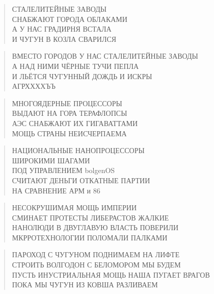 \poemtitle{***}
\begin{verse}
СТАЛЕЛИТЕЙНЫЕ ЗАВОДЫ\\
СНАБЖАЮТ ГОРОДА ОБЛАКАМИ\\
А У НАС ГРАДИРНЯ ВСТАЛА\\
И ЧУГУН В КОЗЛА СВАРИЛСЯ
\end{verse}

\poemtitle{***}
\begin{verse}
ВМЕСТО ГОРОДОВ У НАС СТАЛЕЛИТЕЙНЫЕ ЗАВОДЫ\\
А НАД НИМИ ЧЁРНЫЕ ТУЧИ ПЕПЛА\\
И ЛЬЁТСЯ ЧУГУННЫЙ ДОЖДЬ И ИСКРЫ\\
АГРХХХХЪЪ
\end{verse}

\poemtitle{***}
\begin{verse}
МНОГОЯДЕРНЫЕ ПРОЦЕССОРЫ\\
ВЫДАЮТ НА ГОРА ТЕРАФЛОПСЫ\\
АЭС СНАБЖАЮТ ИХ ГИГАВАТТАМИ\\
МОЩЬ СТРАНЫ НЕИСЧЕРПАЕМА
\end{verse}

\poemtitle{***}
\begin{verse}
НАЦИОНАЛЬНЫЕ НАНОПРОЦЕССОРЫ\\
ШИРОКИМИ ШАГАМИ \\
ПОД УПРАВЛЕНИЕМ bolgenOS\\
СЧИТАЮТ ДЕНЬГИ ОТКАТНЫЕ ПАРТИИ\\
НА СРАВНЕНИЕ АРМ и 86
\end{verse}

\poemtitle{***}
\begin{verse}
НЕСОКРУШИМАЯ МОЩЬ ИМПЕРИИ\\
СМИНАЕТ ПРОТЕСТЫ ЛИБЕРАСТОВ ЖАЛКИЕ\\
НАНОЛЮДИ В ДВУГЛАВУЮ ВЛАСТЬ ПОВЕРИЛИ\\
МКРРОТЕХНОЛОГИИ ПОЛОМАЛИ ПАЛКАМИ
\end{verse}

\poemtitle{***}
\begin{verse}
ПАРОХОД С ЧУГУНОМ ПОДНИМАЕМ НА ЛИФТЕ\\
СТРОИТЬ ВОЛГОДОН С БЕЛОМОРОМ МЫ БУДЕМ\\
ПУСТЬ ИНУСТРИАЛЬНАЯ МОЩЬ НАША ПУГАЕТ ВРАГОВ\\
ПОКА МЫ ЧУГУН ИЗ КОВША РАЗЛИВАЕМ
\end{verse}

